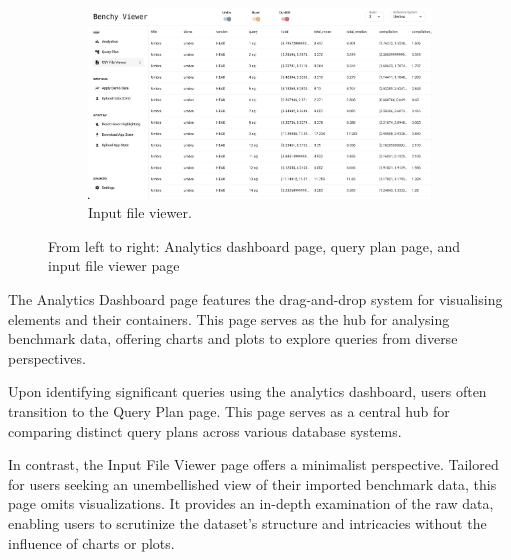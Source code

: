 \begin{figure}[h]
\begin{subfigure}[b]{0.3\linewidth}
      \label{fig:app-query-plan}
  \end{subfigure}
  \hspace{0.5cm} %
  \begin{subfigure}[b]{0.3\linewidth}
    \includegraphics[width=\linewidth]{figures/app-data-viewer.png}
    \caption{Input file viewer.}
      \label{fig:app-data-viewer}
  \end{subfigure}
  \caption{From left to right: Analytics dashboard page, query plan page, and input file viewer page}
  \label{fig:pages}
\end{figure}

The Analytics Dashboard page features the drag-and-drop system for visualising elements and their containers. This page serves as the hub for analysing benchmark data, offering charts and plots to explore queries from diverse perspectives.

Upon identifying significant queries using the analytics dashboard, users often transition to the Query Plan page. This page serves as a central hub for comparing distinct query plans across various database systems. 

In contrast, the Input File Viewer page offers a minimalist perspective. Tailored for users seeking an unembellished view of their imported benchmark data, this page omits visualizations. It provides an in-depth examination of the raw data, enabling users to scrutinize the dataset's structure and intricacies without the influence of charts or plots.















